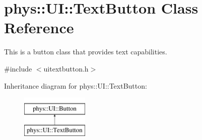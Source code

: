 \hypertarget{classphys_1_1UI_1_1TextButton}{
\section{phys::UI::TextButton Class Reference}
\label{df/d03/classphys_1_1UI_1_1TextButton}
}


This is a button class that provides text capabilities.  




{\ttfamily \#include $<$uitextbutton.h$>$}

Inheritance diagram for phys::UI::TextButton:\begin{figure}[H]
\begin{center}
\leavevmode
\includegraphics[height=2cm]{df/d03/classphys_1_1UI_1_1TextButton}
\end{center}
\end{figure}
